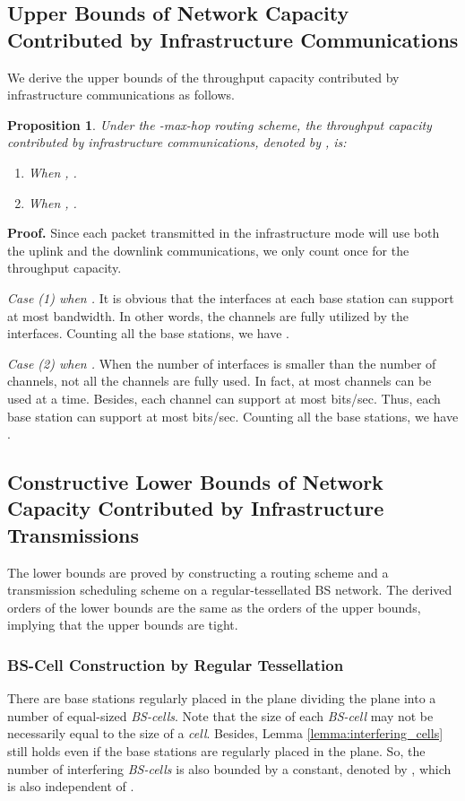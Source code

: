 \documentclass[10pt,journal]{IEEEtran}
\newtheorem{proposition}{Proposition}
\def\done{\hspace*{\fill} }
\begin{document}
\subsection{Upper Bounds of Network Capacity Contributed by Infrastructure Communications}
\label{sec:upper-infra}

We derive the upper bounds of the throughput capacity contributed by infrastructure communications as follows.

\begin{proposition}
\label{prop:upper_infra}
Under the -max-hop routing scheme, the throughput capacity contributed by infrastructure communications, 
denoted by , is:
\begin{enumerate}
\item[(1)] When , . 
 
\item[(2)] When , .
\end{enumerate}
\end{proposition}
\textbf{Proof.}
Since each packet transmitted in the infrastructure mode will use both the uplink and the downlink communications, we only count once for the throughput capacity.

\textit{Case (1) when .}
It is obvious that the  interfaces at each base station can support at most  bandwidth. In other words, the  channels are fully utilized by the  interfaces. Counting all the  base stations, we have .

\textit{Case (2) when .}
When the number of interfaces is smaller than the number of channels, not all the  channels are fully used. In fact, at most  channels can be used at a time. Besides, each channel can support at most  bits/sec. Thus, each base station can support at most  bits/sec. Counting all the  base stations, we have .
\done

\subsection{Constructive Lower Bounds of Network Capacity Contributed by Infrastructure Transmissions}
\label{sec:lower-infra}
The lower bounds are proved by constructing a routing scheme and a transmission scheduling scheme on a regular-tessellated BS network. The derived orders of the lower bounds are the same as the orders of the upper bounds, implying that the upper bounds are tight.

\subsubsection{BS-Cell Construction by Regular Tessellation}
There are  base stations regularly placed in the plane dividing the plane into a number of equal-sized \textit{BS-cells}. Note that the size of each \textit{BS-cell} may not be necessarily equal to the size of a \textit{cell}. Besides, Lemma \ref{lemma:interfering_cells} still holds even if the base stations are regularly placed in the plane. So, the number of interfering \textit{BS-cells} is also bounded by a constant, denoted by , which is also independent of .
\end{document}
